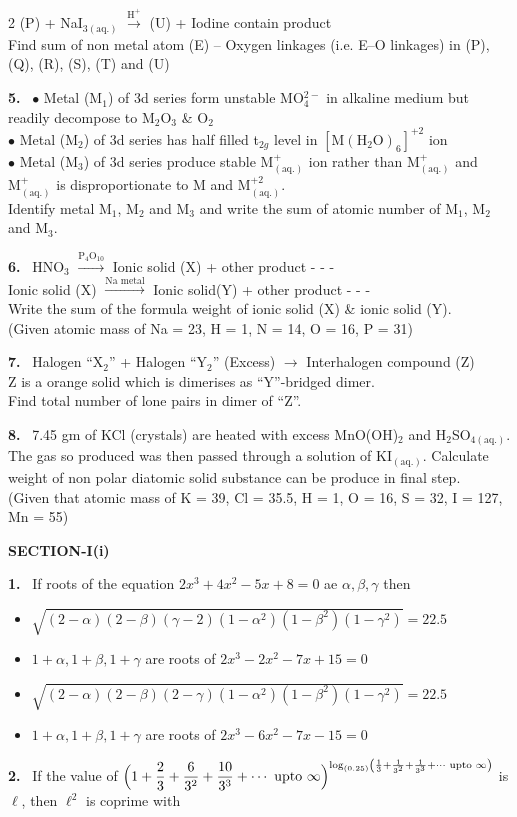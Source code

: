 \documentclass[10pt]{extarticle}
\newcommand{\partsec}[2]{\par\medskip\noindent{\large\bfseries PART-#1: #2}\par\smallskip}
\newcommand{\sect}[1]{\par\smallskip\noindent\textbf{#1}\par}
\newcommand{\qn}[1]{\par\smallskip\noindent\textbf{#1.}~}
\newenvironment{qoptions}{\begin{itemize}[leftmargin=1.8em,itemsep=1pt,topsep=2pt,label={}]}{\end{itemize}}
\newcommand{\opt}[2]{\item[(#1)] #2}
\begin{document}
\begin{multicols}{2}
(P) + NaI$_{3\mathrm{(aq.)}}$ $\xrightarrow{\mathrm{H^+}}$ (U) + Iodine contain product\\
Find sum of non metal atom (E) -- Oxygen linkages (i.e. E--O linkages) in (P), (Q), (R), (S), (T) and (U)
\qn{5} $\bullet$ Metal (M$_1$) of 3d series form unstable MO$_4^{2-}$ in alkaline medium but readily decompose to M$_2$O$_3$ \& O$_2$\\
$\bullet$ Metal (M$_2$) of 3d series has half filled t$_{2g}$ level in $[\mathrm{M(H_2O)_6}]^{+2}$ ion\\
$\bullet$ Metal (M$_3$) of 3d series produce stable $\mathrm{M^+_{(aq.)}}$ ion rather than $\mathrm{M^+_{(aq.)}}$ and $\mathrm{M^+_{(aq.)}}$ is disproportionate to M and $\mathrm{M^{+2}_{(aq.)}}$.\\
Identify metal M$_1$, M$_2$ and M$_3$ and write the sum of atomic number of M$_1$, M$_2$ and M$_3$.
\qn{6} HNO$_3$ $\xrightarrow{\mathrm{P_4O_{10}}}$ Ionic solid (X) + other product - - -\\
Ionic solid (X) $\xrightarrow{\text{Na metal}}$ Ionic solid(Y) + other product - - -\\
Write the sum of the formula weight of ionic solid (X) \& ionic solid (Y).\\
(Given atomic mass of Na = 23, H = 1, N = 14, O = 16, P = 31)
\qn{7} Halogen ``X$_2$'' + Halogen ``Y$_2$'' (Excess) $\longrightarrow$ Interhalogen compound (Z)\\
Z is a orange solid which is dimerises as ``Y''-bridged dimer.\\
Find total number of lone pairs in dimer of ``Z''.
\qn{8} 7.45 gm of KCl (crystals) are heated with excess MnO(OH)$_2$ and H$_2$SO$_{4\mathrm{(aq.)}}$. The gas so produced was then passed through a solution of KI$_{\mathrm{(aq.)}}$. Calculate weight of non polar diatomic solid substance can be produce in final step.\\
(Given that atomic mass of K = 39, Cl = 35.5, H = 1, O = 16, S = 32, I = 127, Mn = 55)
\partsec{3}{MATHEMATICS}
\sect{SECTION-I(i)}
\qn{1} If roots of the equation $2x^3+4x^2-5x+8=0$ ae $\alpha,\beta,\gamma$ then
\begin{qoptions}
\opt{A}{$\sqrt{(2-\alpha)(2-\beta)(\gamma-2)(1-\alpha^2)(1-\beta^2)(1-\gamma^2)}=22.5$}
\opt{B}{$1+\alpha,1+\beta,1+\gamma$ are roots of $2x^3-2x^2-7x+15=0$}
\opt{C}{$\sqrt{(2-\alpha)(2-\beta)(2-\gamma)(1-\alpha^2)(1-\beta^2)(1-\gamma^2)}=22.5$}
\opt{D}{$1+\alpha,1+\beta,1+\gamma$ are roots of $2x^3-6x^2-7x-15=0$}
\end{qoptions}
\qn{2} If the value of $\Bigl(1+\dfrac23+\dfrac6{3^2}+\dfrac{10}{3^3}+\cdots\text{ upto }\infty\Bigr)^{\log_{(0.25)}\left(\frac13+\frac1{3^2}+\frac1{3^3}+\cdots\text{ upto }\infty\right)}$ is $\ell$, then $\ell^2$ is coprime with

\end{multicols}
\end{document}
